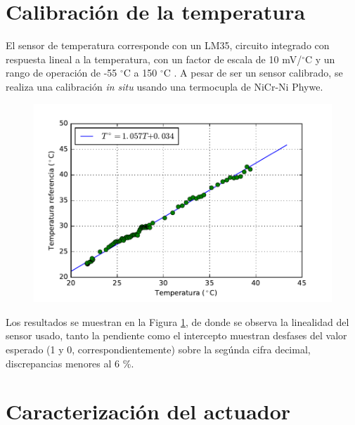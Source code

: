 \documentclass{wileysix}
\begin{document}
\section{Calibraci\'on de la temperatura}
El sensor de temperatura corresponde con un LM35, circuito integrado con respuesta lineal a la temperatura, con un factor de escala de 10 mV/$^\circ$C y un rango de operaci\'on de -55 $^\circ$C a 150 $^\circ$C \cite{LM35}. A pesar de ser un sensor calibrado, se realiza una calibraci\'on \textit{in situ} usando una termocupla de NiCr-Ni Phywe.
\begin{figure}[h]
	\centering
	\includegraphics[width=0.6\linewidth]{extras/temp_cal.pdf}
	\label{fig: temp calibration}
\end{figure}

Los resultados se muestran en la Figura \ref{fig: temp calibration}, de donde se observa la linealidad del sensor usado, tanto la pendiente como el intercepto muestran desfases del valor esperado (1 y 0, correspondientemente) sobre la seg\'unda cifra decimal, discrepancias menores al 6 \%.
\section{Caracterizaci\'on del actuador}
\end{document}
